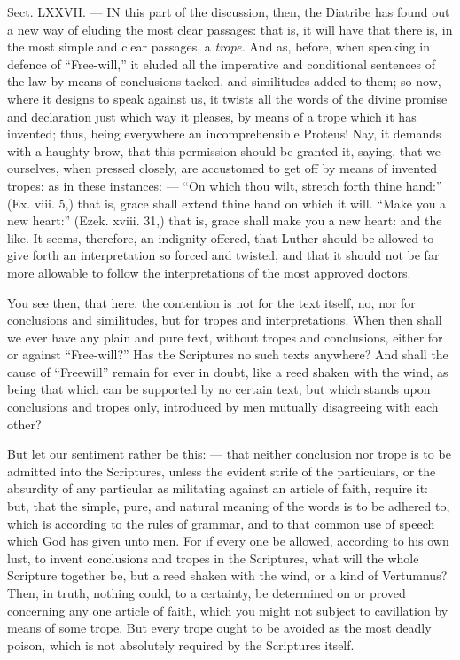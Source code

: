 
Sect. LXXVII. — IN this part of the discussion, then, the Diatribe has found out a new way of eluding the most clear passages: that is, it will have that there is, in the most simple and clear passages, a \emph{trope. }And as, before, when speaking in defence of “Free-will,” it eluded all the imperative and conditional sentences of the law by means of conclusions tacked, and similitudes added to them; so now, where it designs to speak against us, it twists all the words of the divine promise and declaration just which way it pleases, by means of a trope which it has invented; thus, being everywhere an incomprehensible Proteus! Nay, it demands with a haughty brow, that this permission should be granted it, saying, that we ourselves, when pressed closely, are accustomed to get off by means of invented tropes: as in these instances: — “On which thou wilt, stretch forth thine hand:” (Ex. viii. 5,) that is, grace shall extend thine hand on which it will. “Make you a new heart:” (Ezek. xviii. 31,) that is, grace shall make you a new heart: and the like. It seems, therefore, an indignity offered, that Luther should be allowed to give forth an interpretation so forced and twisted, and that it should not be far more allowable to follow the interpretations of the most approved doctors.

You see then, that here, the contention is not for the text itself, no, nor for conclusions and similitudes, but for tropes and interpretations. When then shall we ever have any plain and pure text, without tropes and conclusions, either for or against “Free-will?” Has the Scriptures no such texts anywhere? And shall the cause of “Freewill” remain for ever in doubt, like a reed shaken with the wind, as being that which can be supported by no certain text, but which stands upon conclusions and tropes only, introduced by men mutually disagreeing with each other?

But let our sentiment rather be this: — that neither conclusion nor trope is to be admitted into the Scriptures, unless the evident strife of the particulars, or the absurdity of any particular as militating against an article of faith, require it: but, that the simple, pure, and natural meaning of the words is to be adhered to, which is according to the rules of grammar, and to that common use of speech which God has given unto men. For if every one be allowed, according to his own lust, to invent conclusions and tropes in the Scriptures, what will the whole Scripture together be, but a reed shaken with the wind, or a kind of Vertumnus? Then, in truth, nothing could, to a certainty, be determined on or proved concerning any one article of faith, which you might not subject to cavillation by means of some trope. But every trope ought to be avoided as the most deadly poison, which is not absolutely required by the Scriptures itself.

